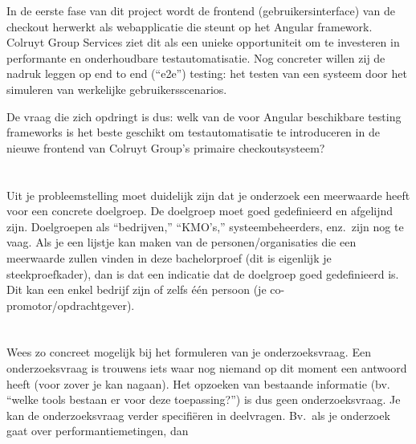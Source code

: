 In de eerste fase van dit project wordt de frontend (gebruikersinterface) van de checkout herwerkt als webapplicatie die steunt op het Angular framework. Colruyt Group Services ziet dit als een unieke opportuniteit om te investeren in performante en onderhoudbare testautomatisatie. Nog concreter willen zij de nadruk leggen op end to end (``e2e'') testing: het testen van een systeem door het simuleren van werkelijke gebruikersscenarios.

De vraag die zich opdringt is dus: welk van de voor Angular beschikbare testing frameworks is het beste geschikt om testautomatisatie te introduceren in de nieuwe frontend van Colruyt Group's primaire checkoutsysteem?


\section{}
\label{sec:probleemstelling}

Uit je probleemstelling moet duidelijk zijn dat je onderzoek een meerwaarde heeft voor een concrete doelgroep. De doelgroep moet goed gedefinieerd en afgelijnd zijn. Doelgroepen als ``bedrijven,'' ``KMO's,'' systeembeheerders, enz.~zijn nog te vaag. Als je een lijstje kan maken van de personen/organisaties die een meerwaarde zullen vinden in deze bachelorproef (dit is eigenlijk je steekproefkader), dan is dat een indicatie dat de doelgroep goed gedefinieerd is. Dit kan een enkel bedrijf zijn of zelfs één persoon (je co-promotor/opdrachtgever).

\section{}
\label{sec:onderzoeksvraag}

Wees zo concreet mogelijk bij het formuleren van je onderzoeksvraag. Een onderzoeksvraag is trouwens iets waar nog niemand op dit moment een antwoord heeft (voor zover je kan nagaan). Het opzoeken van bestaande informatie (bv. ``welke tools bestaan er voor deze toepassing?'') is dus geen onderzoeksvraag. Je kan de onderzoeksvraag verder specifiëren in deelvragen. Bv.~als je onderzoek gaat over performantiemetingen, dan 

\section{}
\label{sec:onderzoeksdoelstelling}

